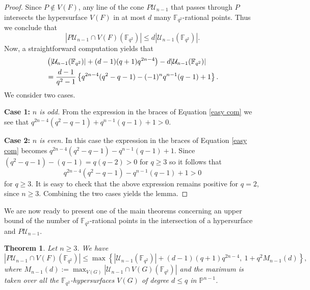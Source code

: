 \documentclass[10pt,a4paper,oneside]{amsproc}
\newtheorem{theorem}{Theorem}[section]
\newcommand{\Fqt}{\mathbb{F}_{q^2}}
\newcommand{\U}{\mathcal{U}}
\def\PP{{\mathbb P}}
\begin{document}
\begin{proof}
    Since $P\notin V(F)$, any line of the cone $P\U_{n-1}$ that passes through $P$ intersects the hypersurface $V(F)$ in at most $d$ many $\Fqt$-rational points. Thus we conclude that $$|P\U_{n-1}\cap V(F)(\Fqt)|\leq d  |\U_{n-1}(\Fqt)|.$$ Now, a straightforward computation yields that 
    \begin{align}
        &\left(|\U_{n-1}(\Fqt)|+(d-1)(q+1)q^{2n-4} \right)- d|\U_{n-1}(\Fqt)|\notag\\
        &=\frac{d-1}{q^2-1}\left\{ q^{2n-4}(q^2-q-1)-(-1)^nq^{n-1}(q-1)+1 \right\}.\label{easy com}
    \end{align}
We consider two cases.

\textbf{Case 1:} \textit{$n$ is odd.} From the expression in the braces of Equation \eqref{easy com} we see that $ q^{2n-4}(q^2-q-1)+q^{n-1}(q-1)+1>0.$


\textbf{Case 2:} \textit{$n$ is even.} In this case the expression in the braces of Equation \eqref{easy com} becomes $q^{2n-4}(q^2-q-1)-q^{n-1}(q-1)+1$. Since $(q^2-q-1)-(q-1)=q(q-2)>0$ for $q\geq 3$ so it follows that $$q^{2n-4}(q^2-q-1)-q^{n-1}(q-1)+1>0$$ for $q\geq 3$. It is easy to check that the above expression remains positive for $q=2$, since $n\geq 3$. Combining the two cases yields the lemma.
\end{proof}

We are now ready to present one of the main theorems concerning an upper bound of the number of $\Fqt$-rational points in the intersection of a hypersurface and $P\U_{n-1}$.

\begin{theorem}\label{rank n}
  Let $n\geq 3$. We have $$|P\U_{n-1}\cap V(F)(\Fqt)|\leq \max \left\{|\U_{n-1}(\Fqt)|+(d-1)(q+1)q^{2n-4}, \ 1+q^2 M_{n-1}(d) \right\},$$ where $M_{n-1}(d):= \max_{V(G)}|\U_{n-1}\cap V(G)(\Fqt)|$ and the maximum is taken over all the $\Fqt$-hypersurfaces $V(G)$ of degree $d\leq q$ in $\PP^{n-1}$.   
\end{theorem}
\end{document}
